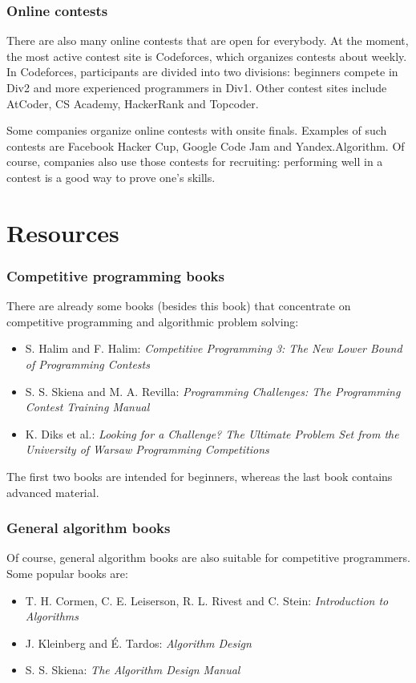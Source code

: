 \subsubsection{Online contests}

There are also many online contests that are open for everybody.
At the moment, the most active contest site is Codeforces,
which organizes contests about weekly.
In Codeforces, participants are divided into two divisions:
beginners compete in Div2 and more experienced programmers in Div1.
Other contest sites include AtCoder, CS Academy, HackerRank and Topcoder.

Some companies organize online contests with onsite finals.
Examples of such contests are Facebook Hacker Cup,
Google Code Jam and Yandex.Algorithm.
Of course, companies also use those contests for recruiting:
performing well in a contest is a good way to prove one's skills.

\section{Resources}

\subsubsection{Competitive programming books}

There are already some books (besides this book) that
concentrate on competitive programming and algorithmic problem solving:

\begin{itemize}
\item S. Halim and F. Halim:
\emph{Competitive Programming 3: The New Lower Bound of Programming Contests} \cite{hal13}
\item S. S. Skiena and M. A. Revilla:
\emph{Programming Challenges: The Programming Contest Training Manual} \cite{ski03}
\item K. Diks et al.: \emph{Looking for a Challenge? The Ultimate Problem Set from
the University of Warsaw Programming Competitions} \cite{dik12}
\end{itemize}

The first two books are intended for beginners,
whereas the last book contains advanced material.

\subsubsection{General algorithm books}

Of course, general algorithm books are also suitable for
competitive programmers.
Some popular books are:

\begin{itemize}
\item T. H. Cormen, C. E. Leiserson, R. L. Rivest and C. Stein:
\emph{Introduction to Algorithms} \cite{cor09}
\item J. Kleinberg and É. Tardos:
\emph{Algorithm Design} \cite{kle05}
\item S. S. Skiena:
\emph{The Algorithm Design Manual} \cite{ski08}
\end{itemize}
